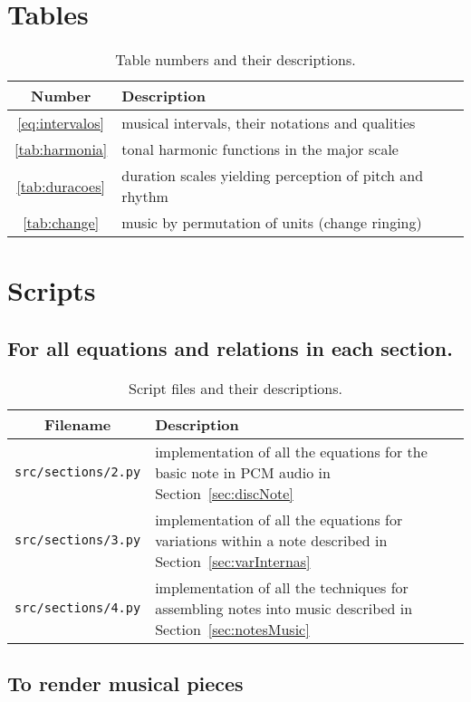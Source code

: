 \documentclass{scrreprt}
\begin{document}
\clearpage
\section{Tables}

\begin{table*}[htp!]
\centering
\caption{Table numbers and their descriptions.}
\begin{tabular}{ c | p{12cm} }
   Number & Description \\\hline
 \ref{eq:intervalos} & musical intervals, their notations and qualities \\
 \ref{tab:harmonia} & tonal harmonic functions in the major scale \\
 \ref{tab:duracoes} & duration scales yielding perception of pitch and rhythm \\
 \ref{tab:change} & music by permutation of units (change ringing) \\
\end{tabular}
\end{table*}

\clearpage
\section{Scripts}
\subsection{For all equations and relations in each section.}

\begin{table*}[htp!]
\centering
\caption{Script files and their descriptions.}
\begin{tabular}{ c | p{12cm} }
   Filename & Description \\\hline
  \texttt{src/sections/2.py} & implementation of all the equations for the basic note in PCM audio in Section~\ref{sec:discNote} \\
  \texttt{src/sections/3.py} & implementation of all the equations for variations within a note described in Section~\ref{sec:varInternas} \\
  \texttt{src/sections/4.py} & implementation of all the techniques for assembling notes into music described in Section~\ref{sec:notesMusic} \\
\end{tabular}
\end{table*}

\clearpage
\subsection{To render musical pieces}
\end{document}
